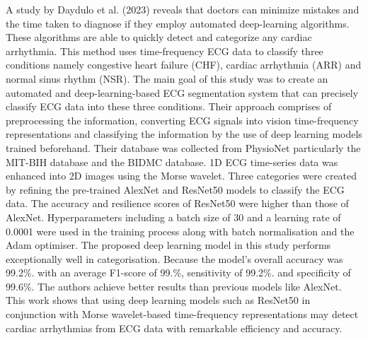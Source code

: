 A study by Daydulo et al. (2023) reveals that doctors can minimize mistakes and the time taken to diagnose if they employ automated deep-learning algorithms. These algorithms are able to quickly detect and categorize any cardiac arrhythmia. This method uses time-frequency ECG data to classify three conditions namely congestive heart failure (CHF), cardiac arrhythmia (ARR) and normal sinus rhythm (NSR). The main goal of this study was to create an automated and deep-learning-based ECG segmentation system that can precisely classify ECG data into these three conditions. Their approach comprises of preprocessing the information, converting ECG signals into vision time-frequency representations and classifying the information by the use of deep learning models trained beforehand. Their database was collected from PhysioNet particularly the MIT-BIH database and the BIDMC database. 1D ECG time-series data was enhanced into 2D images using the Morse wavelet. Three categories were created by refining the pre-trained AlexNet and ResNet50 models to classify the ECG data. The accuracy and resilience scores of ResNet50 were higher than those of AlexNet. Hyperparameters including a batch size of 30 and a learning rate of 0.0001 were used in the training process along with batch normalisation and the Adam optimiser. The proposed deep learning model in this study performs exceptionally well in categorisation. Because the model's overall accuracy was 99.2\%. with an average F1-score of 99.\%, sensitivity of 99.2\%. and specificity of 99.6\%. The authors achieve better results than previous models like AlexNet. This work shows that using deep learning models such as ResNet50 in conjunction with Morse wavelet-based time-frequency representations may detect cardiac arrhythmias from ECG data with remarkable efficiency and accuracy.

